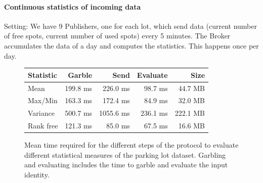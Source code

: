 \paragraph{Continuous statistics of incoming data}



Setting: We have 9 Publishers, one for each lot, which send data (current
number of free spots, current number of used spots) every 5 minutes.  The
Broker accumulates the data of a day and computes the statistics.  This
happens once per day.



\begin{figure}
    \begin{tabular}{l*{3}{r}r}
    \textbf{Statistic}  & \textbf{Garble} & \textbf{Send} & \textbf{Evaluate} & \textbf{Size} \\
    \hline
    Mean       & 199.8 ms & 226.0  ms & 98.7  ms & 44.7 MB \\
    Max/Min    & 163.3 ms & 172.4  ms & 84.9  ms & 32.0 MB \\
    Variance   & 500.7 ms & 1055.6 ms & 236.1 ms & 222.1 MB \\
    \hline
    Rank free  & 121.3 ms & 85.0 ms & 67.5 ms & 16.6 MB \\
    \end{tabular}
    \caption{Mean time required for the different steps of the protocol to
    evaluate different statistical measures of the parking lot dataset.
    Garbling and evaluating includes the time to garble and evaluate the input
    identity.}
    \label{stats-times}
\end{figure}

